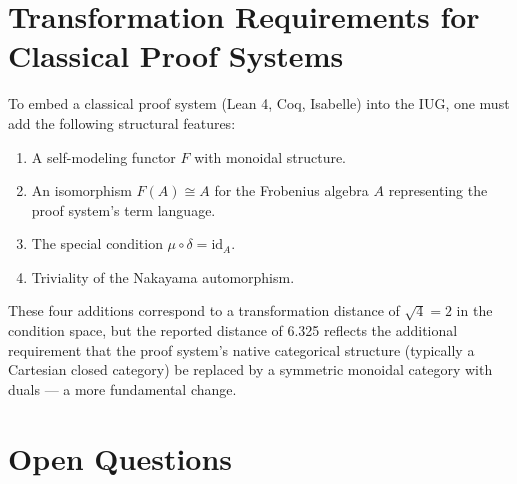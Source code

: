 \documentclass{article}
\begin{document}
\section{Transformation Requirements for Classical Proof Systems}

To embed a classical proof system (Lean 4, Coq, Isabelle) into the IUG, one must add the following structural features:

\begin{enumerate}
\item A self-modeling functor $F$ with monoidal structure.
\item An isomorphism $F(A) \cong A$ for the Frobenius algebra $A$ representing the proof system's term language.
\item The special condition $\mu \circ \delta = \text{id}_A$.
\item Triviality of the Nakayama automorphism.
\end{enumerate}

These four additions correspond to a transformation distance of $\sqrt{4} = 2$ in the condition space, but the reported distance of 6.325 reflects the additional requirement that the proof system's native categorical structure (typically a Cartesian closed category) be replaced by a symmetric monoidal category with duals — a more fundamental change.

\section{Open Questions}
\end{document}
